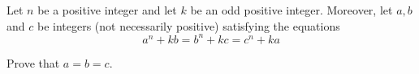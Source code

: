 Let $n$ be a positive integer and let $k$ be an odd positive integer. Moreover, let $a,b$ and $c$ be integers (not necessarily positive) satisfying the equations\[a^n+kb=b^n+kc=c^n+ka \]

Prove that $a=b=c$.